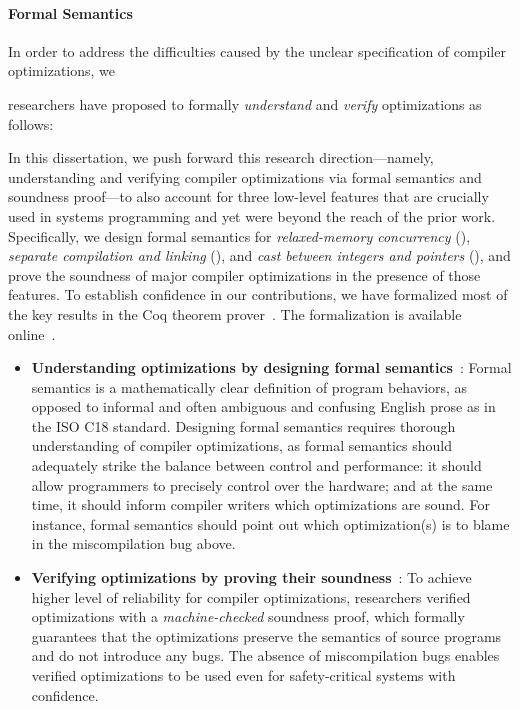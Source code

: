 \paragraph{Formal Semantics}

In order to address the difficulties caused by the unclear specification of compiler optimizations,
we


researchers have proposed to formally \emph{understand} and \emph{verify} optimizations as follows:


In this dissertation, we push forward this research direction---namely, understanding and verifying
compiler optimizations via formal semantics and soundness proof---to also account for three
low-level features that are crucially used in systems programming and yet were beyond the reach of
the prior work.  Specifically, we design formal semantics for \emph{relaxed-memory concurrency}
(), \emph{separate compilation and linking} (), and \emph{cast
  between integers and pointers} (), and prove the soundness of major compiler
optimizations in the presence of those features.  To establish confidence in our contributions, we
have formalized most of the key results in the Coq theorem prover~\cite{coq}.  The formalization is
available online~\cite{kang-phd-thesis-web}.



\begin{itemize}
\item \textbf{Understanding optimizations by designing formal
    semantics}~\cite{norrish1998c,leroy:compcert,ellison2012executable}: Formal semantics is a
  mathematically clear definition of program behaviors, as opposed to informal and often ambiguous
  and confusing English prose as in the ISO C18 standard.  Designing formal semantics requires
  thorough understanding of compiler optimizations, as formal semantics should adequately strike the
  balance between control and performance: it should allow programmers to precisely control over the
  hardware; and at the same time, it should inform compiler writers which optimizations are sound.
  For instance, formal semantics should point out which optimization(s) is to blame in the
  miscompilation bug above.

\item \textbf{Verifying optimizations by proving their soundness}~\cite{compcert,vellvm}: To achieve
  higher level of reliability for compiler optimizations, researchers verified optimizations with a
  \emph{machine-checked} soundness proof, which formally guarantees that the optimizations preserve
  the semantics of source programs and do not introduce any bugs.  The absence of miscompilation
  bugs enables verified optimizations to be used even for safety-critical systems with confidence.

\end{itemize}

